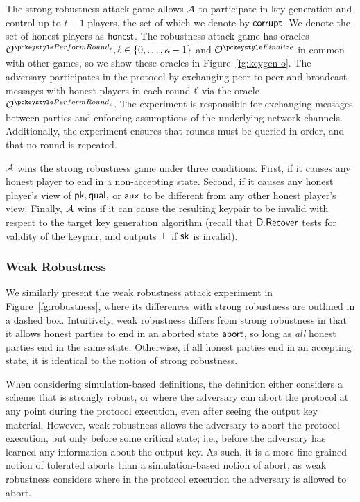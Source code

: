 The strong robustness attack game allows $\mathcal{A}$ to participate in key generation and control up to $t-1$ players,
the set of which we denote by $\mathsf{corrupt}$.
We denote the set of honest players as $\mathsf{honest}$.
The robustness attack game has oracles $\oraclekg, \currentround \in
\{ 0, \ldots, \numrounds-1 \}  $
and $\oraclefinalize$ in common with other games,
so we show these oracles in Figure~\ref{fg:keygen-o}.
The adversary participates in the protocol by exchanging peer-to-peer and
broadcast messages with honest players in each round $\ell$ via the oracle
$\oraclekg$.
The experiment is responsible for exchanging messages between parties and enforcing assumptions of the underlying network channels.
Additionally, the experiment ensures that rounds must be queried in order, and that no round is repeated.

$\mathcal{A}$ wins the strong robustness game under three conditions.
First, if it causes any honest player to end in a non-accepting state.
Second, if it causes any honest player's view of $\mathsf{pk}, \mathsf{qual},$ or $\mathsf{aux}$ to
be different from any other honest player's view.
Finally, $\mathcal{A}$ wins if it can cause the resulting keypair to be invalid with
respect to the target key generation algorithm (recall that $\mathsf{D}.\mathsf{Recover}$ tests for validity of the keypair, and outputs $\bot$ if $\mathsf{sk}$ is invalid).

\subsubsection{Weak Robustness}
We similarly present the weak robustness attack experiment in Figure~\ref{fg:robustness},
where its differences with strong robustness are outlined in a dashed box.
Intuitively, weak robustness differs from strong robustness in that it
allows honest parties to end in an aborted state $\mathsf{abort}$,
so long as \emph{all} honest parties end in the same state.
Otherwise, if all honest parties end in an accepting state,
it is identical to the notion of strong robustness.

When considering simulation-based definitions,
the definition either considers a scheme that is strongly robust,
or where the adversary can abort the protocol at any point during the protocol execution,
even after seeing the output key material.
However, weak robustness allows the adversary to abort the protocol execution,
but only before some critical state;
i.e., before the adversary has learned any information about the output key.
As such, it is a more fine-grained notion of tolerated aborts than a simulation-based notion of abort,
as weak robustness considers where in the protocol execution the adversary is
allowed to abort.


